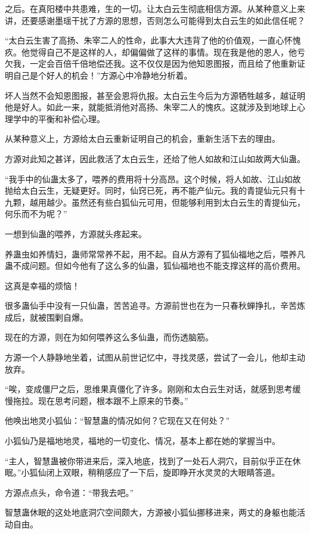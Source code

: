 \begin{this_body}
之后。在真阳楼中共患难，生的一切。让太白云生彻底相信方源。从某种意义上来讲，还要感谢墨瑶干扰了方源的思想，否则怎么可能得到太白云生的如此信任呢？

“太白云生害了高扬、朱宰二人的性命，此事大大违背了他的价值观，一直心怀愧疚。他觉得自己不是这样的人，却偏偏做了这样的事情。现在我是他的恩人，他亏欠我，一定会百倍千倍地偿还我。这不仅仅是因为他知恩图报，而且给了他重新证明自己是个好人的机会！”方源心中冷静地分析着。

坏人当然不会知恩图报，甚至会恩将仇报。太白云生今后为方源牺牲越多，越证明他是好人。如此一来，就能抵消他对高扬、朱宰二人的愧疚。这就涉及到地球上心理学中的平衡和补偿心理。

从某种意义上，方源给太白云重新证明自己的机会，重新生活下去的理由。

方源对此知之甚详，因此救活了太白云生，还给了他人如故和江山如故两大仙蛊。

“我手中的仙蛊太多了，喂养的费用将十分高昂。这个时候，将人如故、江山如故抛给太白云生，无疑更好。同时，仙窍已死，再不能产仙元。我的青提仙元只有十九颗，越用越少。虽然还有些白狐仙元可用，但能够利用到太白云生的青提仙元，何乐而不为呢？”

一想到仙蛊的喂养，方源就头疼起来。

养蛊虫如养情妇，蛊师常常养不起，用不起。自从方源有了狐仙福地之后，喂养凡蛊不成问题。但如今他有了这么多的仙蛊，狐仙福地也不能支撑这样的高价费用。

这真是幸福的烦恼！

很多蛊仙手中没有一只仙蛊，苦苦追寻。方源前世也在为一只春秋蝉挣扎，辛苦炼成后，就被围剿自爆。

现在的方源，则在为如何喂养这么多仙蛊，而伤透脑筋。

方源一个人静静地坐着，试图从前世记忆中，寻找灵感，尝试了一会儿，他却主动放弃。

“唉，变成僵尸之后，思维果真僵化了许多。刚刚和太白云生对话，就感到思考缓慢拖拉。现在思考问题，根本跟不上原来的节奏。”

他唤出地灵小狐仙：“智慧蛊的情况如何？它现在又在何处？”

小狐仙乃是福地地灵，福地的一切变化、情况，基本上都在她的掌握当中。

“主人，智慧蛊被你带进来后，深入地底，找到了一处石人洞穴，目前似乎正在休眠。”小狐仙闭上双眼，稍稍感应了一下后，旋即睁开水灵灵的大眼睛答道。

方源点点头，命令道：“带我去吧。”

智慧蛊休眠的这处地底洞穴空间颇大，方源被小狐仙挪移进来，两丈的身躯也能活动自由。


\end{this_body}
